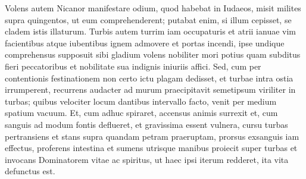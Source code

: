 \begin{biblechapter}
\verse Volens autem Nicanor manifestare odium, quod habebat in Iudaeos, misit milites supra quingentos, ut eum comprehenderent; 
\verse putabat enim, si illum cepisset, se cladem istis illaturum. 
\verse Turbis autem turrim iam occupaturis et atrii ianuae vim facientibus atque iubentibus ignem admovere et portas incendi, ipse undique comprehensus supposuit sibi gladium 
\verse volens nobiliter mori potius quam subditus fieri peccatoribus et nobilitate sua indignis iniuriis affici. 
\verse Sed, cum per contentionis festinationem non certo ictu plagam dedisset, et turbae intra ostia irrumperent, recurrens audacter ad murum praecipitavit semetipsum viriliter in turbas; 
\verse quibus velociter locum dantibus intervallo facto, venit per medium spatium vacuum.  
\verse Et, cum adhuc spiraret, accensus animis surrexit et, cum sanguis ad modum fontis deflueret, et gravissima essent vulnera, cursu turbas pertransiens et stans supra quandam petram praeruptam, 
\verse prorsus exsanguis iam effectus, proferens intestina et sumens utrisque manibus proiecit super turbas et invocans Dominatorem vitae ac spiritus, ut haec ipsi iterum redderet, ita vita defunctus est. 
\end{biblechapter}

